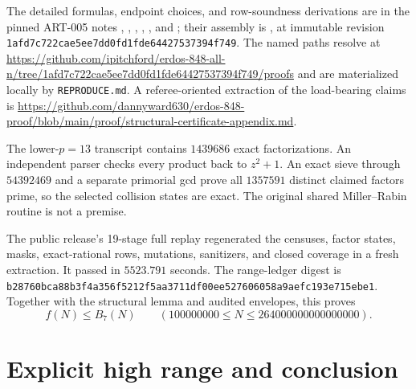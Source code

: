 \documentclass[11pt]{article}
\newcommand{\Bseven}{B_7}
\newcommand{\sha}[1]{\texttt{\nolinkurl{#1}}}
\begin{document}
The detailed formulas, endpoint choices, and row-soundness derivations are in
the pinned ART-005 notes ,
, ,
,
, and
; their assembly is
, at immutable revision
\sha{1afd7c722cae5ee7dd0fd1fde64427537394f749}.  The named paths resolve at
\url{https://github.com/ipitchford/erdos-848-all-n/tree/1afd7c722cae5ee7dd0fd1fde64427537394f749/proofs}
and are materialized locally by \texttt{REPRODUCE.md}.  A referee-oriented
extraction of the load-bearing claims is
\url{https://github.com/dannyward630/erdos-848-proof/blob/main/proof/structural-certificate-appendix.md}.

The lower-$p=13$ transcript contains $1439686$ exact factorizations.  An
independent parser checks every product back to $z^2+1$.  An exact sieve
through $54392469$ and a separate primorial gcd prove all $1357591$
distinct claimed factors prime, so the selected collision states are exact.
The original shared Miller--Rabin routine is not a premise.

The public release's 19-stage full replay regenerated the censuses, factor
states, masks, exact-rational rows, mutations, sanitizers, and closed coverage
in a fresh extraction.  It passed in $5523.791$ seconds.  The range-ledger
digest is
\sha{b28760bca88b3f4a356f5212f5aa3711df00ee527606058a9aefc193e715ebe1}.
Together with the structural lemma and audited envelopes, this proves
\[
 f(N)\le\Bseven(N)\qquad
 (100000000\le N\le264000000000000000).
\]

\section{Explicit high range and conclusion}
\end{document}
